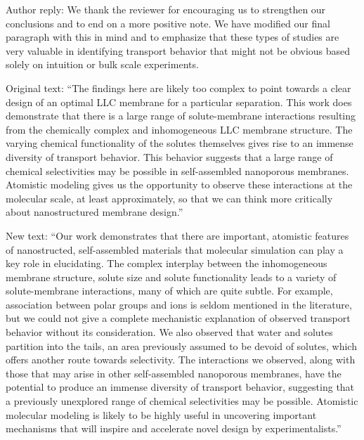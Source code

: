 \documentclass{article}
\begin{document}
\begin{enumerate}
    Author reply: We thank the reviewer for encouraging us to strengthen our conclusions and
    to end on a more positive note. We have modified our final paragraph with this in mind 
    and to emphasize that these types of studies are very valuable in identifying transport
    behavior that might not be obvious based solely on intuition or bulk scale experiments.
    
    Original text: ``The findings here are likely too complex to point towards a clear 
    design of an optimal LLC membrane for a particular separation. This work does demonstrate
    that there is a large range of solute-membrane interactions resulting from the
    chemically complex and inhomogeneous LLC membrane structure. The varying chemical 
    functionality of the solutes themselves gives rise to an immense diversity of transport 
    behavior. This behavior suggests that a large range of chemical selectivities may be 
    possible in self-assembled nanoporous membranes. Atomistic modeling gives us the 
    opportunity to observe these interactions at the molecular scale, at least approximately,
    so that we can think more critically about nanostructured membrane design.''
    
    New text: ``Our work demonstrates that there are important, atomistic features of nanostructed, 
    self-assembled materials that molecular simulation can play a key role in elucidating.
    The complex interplay between the inhomogeneous membrane structure, solute size and 
    solute functionality leads to a variety of solute-membrane interactions, many of which
    are quite subtle. For example, association between polar groups and ions is seldom 
    mentioned in the literature, but we could not give a complete mechanistic explanation
    of observed transport behavior without its consideration. We also observed that water
    and solutes partition into the tails, an area previously assumed to be devoid of solutes,
    which offers another route towards selectivity. The interactions we observed, along 
    with those that may arise in other self-assembled nanoporous membranes, have the 
    potential to produce an immense diversity of transport behavior, suggesting that a 
    previously unexplored range of chemical selectivities may be possible. Atomistic 
    molecular modeling is likely to be highly useful in uncovering important mechanisms
    that will inspire and accelerate novel design by experimentalists.''
	
\end{enumerate}
\end{document}
